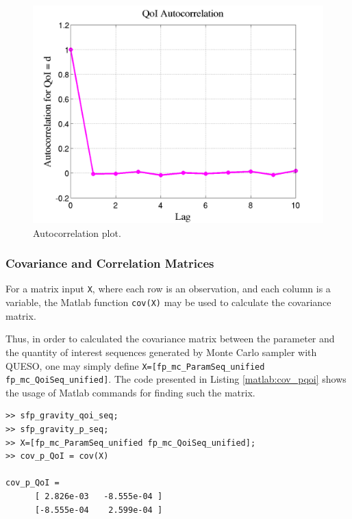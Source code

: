\begin{figure}[htb]
\centering
\includegraphics[scale=0.40]{rawfigs/sfp_gravity_autocorrelation.png}
\vspace*{-10pt}
\caption{Autocorrelation plot.}
\label{fig:sfp_gravity_autocorrelation}
\end{figure}

\subsubsection{Covariance and Correlation Matrices}

For a matrix input \verb+X+, where each row is an observation, and each column is a variable, the Matlab function \verb+cov(X)+ may be used to calculate the covariance matrix.

Thus,  in order to calculated the covariance matrix between the parameter and the quantity of interest sequences generated by Monte Carlo sampler with QUESO,
one may simply define \verb+X=[fp_mc_ParamSeq_unified fp_mc_QoiSeq_unified]+.
The code presented in Listing \ref{matlab:cov_pqoi} shows the usage of Matlab commands for finding such the matrix.

\begin{lstlisting}[label=matlab:cov_pqoi,caption={Matlab code for the matrix of covariance between parameter $g$ and QoI $d$.}]
% inside Matlab
>> sfp_gravity_qoi_seq;
>> sfp_gravity_p_seq;
>> X=[fp_mc_ParamSeq_unified fp_mc_QoiSeq_unified];
>> cov_p_QoI = cov(X)

cov_p_QoI =
	  [ 2.826e-03 	-8.555e-04 ] 
	  [-8.555e-04 	 2.599e-04 ]

\end{lstlisting}

